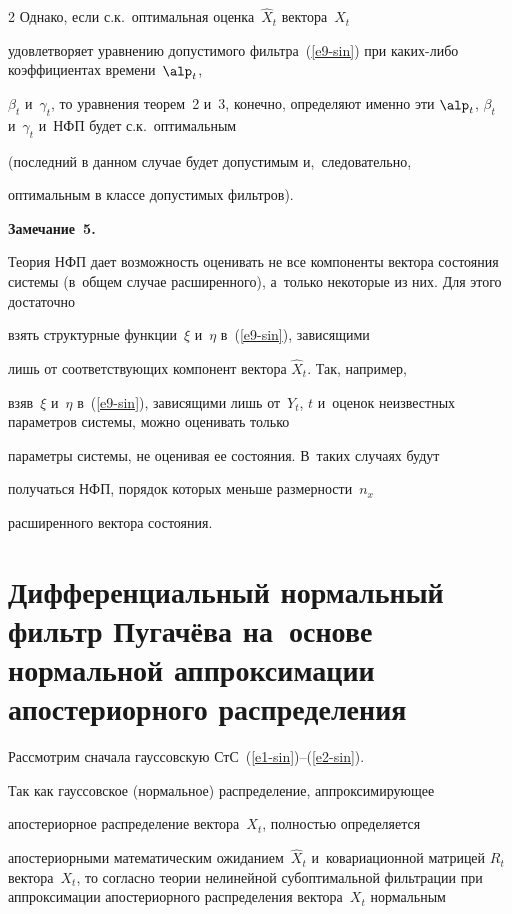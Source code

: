 \begin{multicols}{2}
Однако, если с.к.\ оптимальная оценка~$\hat{X}_t$ вектора~$X_t$

удовлетворяет уравнению допустимого фильтра~(\ref{e9-sin}) при ка\-ких-ли\-бо коэффициентах времени~$\alp_t$,

$\beta_t$ и~$\gamma_t$, то уравнения теорем~2 и~3, конечно, определяют именно эти $\alp_t$, $\beta_t$ и~$\gamma_t$ и~НФП будет  с.к.\ оптимальным

(последний в данном случае будет допустимым и,~следовательно,

оптимальным в классе допустимых фильтров).



\smallskip



\noindent

\textbf{Замечание~5.}

Теория НФП дает возможность оценивать не все компоненты вектора состояния системы (в~общем случае расширенного), а~только некоторые из них. Для этого достаточно

взять структурные функции~$\xi$ и~$\eta$ в~(\ref{e9-sin}), зависящими

лишь от соответствующих компонент вектора  $\hat{X}_t$. Так, например,

взяв~$\xi$ и~$\eta$ в~(\ref{e9-sin}), зависящими лишь от~$Y_t$, $t$ и~оценок неизвестных параметров системы, можно оценивать только

параметры системы, не оценивая ее состояния. В~таких случаях будут

получаться НФП, порядок которых меньше размерности~$n_x$

расширенного вектора состояния.





\section{Дифференциальный нормальный  фильтр Пугачёва на~основе нормальной аппроксимации апостериорного распределения}



Рассмотрим сначала гауссовскую СтС~(\ref{e1-sin})--(\ref{e2-sin}).

Так как гауссовское (нормальное) распределение, аппроксимирующее

апостериорное распределение вектора~$X_t$, полностью определяется

апостериорными математическим ожиданием~$\hat{X}_t$ и~ковариационной матрицей  $R_t$ вектора~$X_t$, то согласно теории нелинейной субоптимальной фильтрации при аппроксимации апостериорного распределения вектора~$X_t$ нормальным


\end{multicols}
